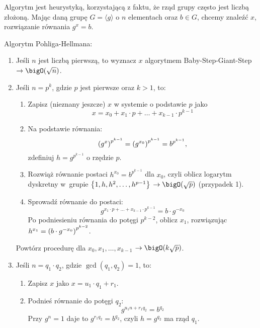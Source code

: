 Algorytm jest heurystyką, korzystającą z faktu, że rząd grupy często jest liczbą złożoną. Mając daną grupę \( G = \langle g \rangle \) o \( n \) elementach oraz \( b \in G \), chcemy znaleźć \( x \), rozwiązanie równania \( g^x = b \).
\begin{greyframe}
	Algorytm Pohliga-Hellmana:
	\begin{enumerate}
		\item Jeśli \( n \) jest liczbą pierwszą, to wyznacz \( x \) algorytmem Baby-Step-Giant-Step \\ \( \rightarrow \bigO(\sqrt{n}) \).
		\item Jeśli \( n = p^k \), gdzie \( p \) jest pierwsze oraz \( k > 1 \), to:
		      \begin{enumerate}
			      \item Zapisz (nieznany jeszcze) \( x \) w systemie o podstawie \( p \) jako
			            \[
				            x = x_0 + x_1 \cdot p + \ldots + x_{k-1} \cdot p^{k-1}
			            \]
			      \item Na podstawie równania:
			            \[
				            \left(g^x\right)^{p^{k-1}} = \left(g^{x_0}\right)^{p^{k-1}} = b^{p^{k-1}},
			            \]
			            zdefiniuj \( h = g^{p^{k-1}} \) o rzędzie \( p \).
			      \item Rozwiąż równanie postaci \( h^{x_0} = b^{p^{k-1}} \) dla \( x_0 \), czyli oblicz logarytm dyskretny w~grupie \( \set{1, h, h^2, \ldots, h^{p-1}} \) \( \rightarrow \bigO(\sqrt{p}) \) (przypadek 1).
			      \item Sprowadź równanie do postaci:
			            \[
				            g^{x_1 \cdot p + \ldots + x_{k-1} \cdot p^{k-1}} = b \cdot g^{-x_0}
			            \]
			            Po podniesieniu równania do potęgi \( p^{k-2} \), oblicz \( x_1 \), rozwiązując \( h^{x_1} = \left(b \cdot g^{-x_0}\right)^{p^{k-2}} \).
		      \end{enumerate}
		      Powtórz procedurę dla \( x_0, x_1, \ldots, x_{k-1} \) \( \rightarrow \bigO(k \sqrt{p}) \).
		\item Jeśli \( n  = q_1 \cdot q_2 \), gdzie \( \gcd(q_1, q_2) = 1 \), to:
		      \begin{enumerate}
			      \item Zapisz \( x \) jako \( x = u_1 \cdot q_1 + r_1 \).
			      \item Podnieś równanie do potęgi \( q_2\):
			            \[
				            g^{u_1n + r_1q_2} = b^{q_2}
			            \]
			            Przy \( g^n = 1 \) daje to \( g^{r_1 q_2} = b^{q_2} \), czyli \( h = g^{q_2} \) ma rząd \( q_1 \).

\end{enumerate}
\end{enumerate}
\end{greyframe}
